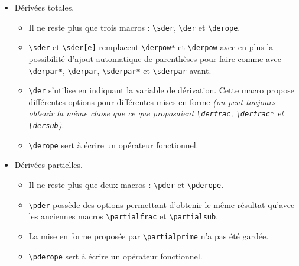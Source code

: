 \documentclass[12pt,a4paper]{book}
\newcommand\env[1]{\texttt{#1}}
\newcommand\macro[1]{\env{\textbackslash{}#1}}
\theoremstyle{definition}
\begin{document}
{{\begin{description}
\begin{itemize}[itemsep=.5em]
\begin{itemize}[itemsep=.5em]
            \item Dérivées totales.
            
            \begin{itemize}[itemsep=.5em, label=$\rightarrow$]
                \item Il ne reste plus que trois macros : \macro{sder}, \macro{der} et \macro{derope}.
    
                \item \macro{sder} et \macro{sder[e]} remplacent \macro{derpow*} et \macro{derpow} avec en plus la possibilité d'ajout automatique de parenthèses pour faire comme avec \macro{derpar*}, \macro{derpar}, \macro{sderpar*} et \macro{sderpar} avant.
    
    
                \item \macro{der} s'utilise en indiquant la variable de dérivation. Cette macro propose différentes options pour différentes mises en forme 
                      \emph{(on peut toujours obtenir la même chose que ce que proposaient \macro{derfrac}, \macro{derfrac*} et \macro{dersub})}.
    
                \item \macro{derope} sert à écrire un opérateur fonctionnel.
    	    \end{itemize}
    
    
            \item Dérivées partielles.
            
            \begin{itemize}[itemsep=.5em, label=$\rightarrow$]
                \item Il ne reste plus que deux macros : \macro{pder} et \macro{pderope}.
    
                \item \macro{pder} possède des options permettant d'obtenir le même résultat qu'avec les anciennes macros \macro{partialfrac} et \macro{partialsub}.
    
                \item La mise en forme proposée par \macro{partialprime} n'a pas été gardée.
    
                \item \macro{pderope} sert à écrire un opérateur fonctionnel.
    	    \end{itemize}
        \end{itemize}
    
    
    

\end{itemize}
\end{description}}}
\end{document}

